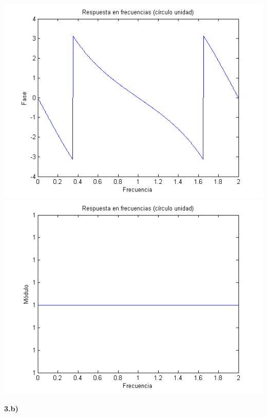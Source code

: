 \documentclass[a4paper,12pt]{article}
\begin{document}
\begin{center}
\includegraphics[width=.8 \textwidth]{ejercicio-4-6-a-fase.png}
\includegraphics[width=.8 \textwidth]{ejercicio-4-6-a-modulo.png}
\end{center}

\textbf{3.b)} \\
\end{document}
